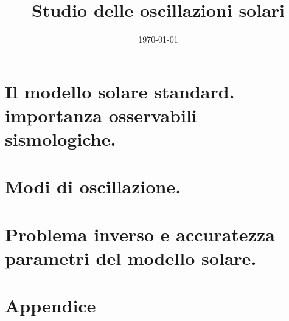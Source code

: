\documentclass[oneside,11pt,fleqn]{memoir}%
\author{ }
\title{Studio delle oscillazioni solari}
\date{\today}
\begin{document}
\frontmatter
{}
\maketitle

\tableofcontents

\clearpage

\thispagestyle{empty}



\clearpage

\mainmatter
{}

\part{Il modello solare standard. importanza osservabili sismologiche.}




\part{Modi di oscillazione.}



\part{Problema inverso e accuratezza parametri del modello solare.}



\backmatter


\part{Appendice}



\printbibliography
\end{document}
